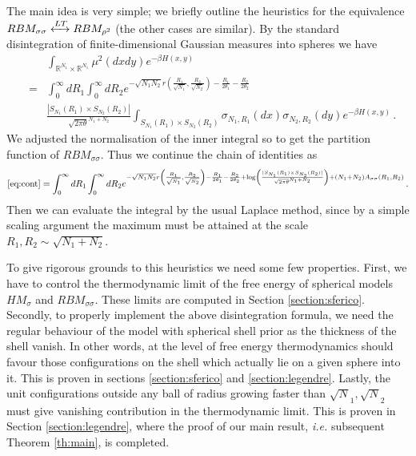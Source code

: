 \documentclass[10pt,oneside,a4paper,reqno]{amsart}  %
\def\be{\begin{equation}}
\def\ee{\end{equation}}
\def\bea{\begin{eqnarray}}
\def\eea{\end{eqnarray}}
\def\nn{\nonumber}
\def\ie{\textit{i.e. }}
\def\b{\beta}
\def\r{\rho}
\def\s{\sigma}
\def\R{\mathbb{R}}
\theoremstyle{plain}
\numberwithin{equation}{section}
\begin{document}
The main idea is very simple; we briefly outline the heuristics for the equivalence $RBM_{\s\s}\xleftrightarrow{LT} RBM_{\r^2}$ (the other cases are similar). By the standard disintegration of finite-dimensional Gaussian measures into spheres we have
\bea
&&\int_{\R^{N_1}\times \R^{N_1} }\mu^2(dxdy)e^{-\b H(x,y)}\nn\\
&=&\int_{0}^{\infty} dR_1\int_{0}^{\infty}dR_2 e^{-\sqrt{N_1N_2}r\left(\frac{R_1}{\sqrt{N_1}},\frac{R_2}{\sqrt{N_2}}\right)-\frac{R_1}{2\theta_1}-\frac{R_2}{2\theta_2}}\nn\\
&&\frac{|S_{N_1}(R_1)\times S_{N_2}(R_2)|}{\sqrt{2\pi\theta}^{N_1+N_2}}\int_{S_{N_1}(R_1)\times S_{N_2}(R_2)}\s_{N_1,R_1}(dx)\s_{N_2,R_2}(dy)e^{-\b H(x,y)}\,.\label{eq:cont}
\eea
We adjusted the normalisation of the inner integral so to get the partition function of $RBM_{\s\s}$. Thus we continue the chain of identities as
\be
\eqref{eq:cont}=\int_{0}^{\infty} dR_1\int_{0}^{\infty}dR_2 e^{-\sqrt{N_1N_2}r\left(\frac{R_1}{\sqrt{N_1}},\frac{R_2}{\sqrt{N_2}}\right)-\frac{R_1}{2\theta_1}-\frac{R_2}{2\theta_2}+\log\left(\frac{|S_{N_1}(R_1)\times S_{N_2}(R_2)|}{\sqrt{2\pi\theta}^{N_1+N_2}}\right)+(N_1+N_2)A_{\s\s}(R_1,R_2)}\,. 
\ee
Then we can evaluate the integral by the usual Laplace method, since by a simple scaling argument the maximum must be attained at the scale $R_1,R_2\sim\sqrt{N_1+N_2}$. 

To give rigorous grounds to this heuristics we need some few properties. First, we have to control the thermodynamic limit of the free energy of spherical models $HM_\s$ and $RBM_{\s\s}$. These limits are computed in Section \ref{section:sferico}. Secondly, to properly implement the above disintegration formula, we need the regular behaviour of the model with spherical shell prior as the thickness of the shell vanish. In other words, at the level of free energy thermodynamics should favour those configurations on the shell which actually lie on a given sphere into it. This is proven in sections \ref{section:sferico} and \ref{section:legendre}. Lastly, the unit configurations outside any ball of radius growing faster  than $\sqrt N_1, \sqrt N_2$ must give vanishing contribution in the thermodynamic limit. This is proven in Section \ref{section:legendre}, where the proof of our main result, \ie subsequent Theorem \ref{th:main}, is completed. 
\end{document}
